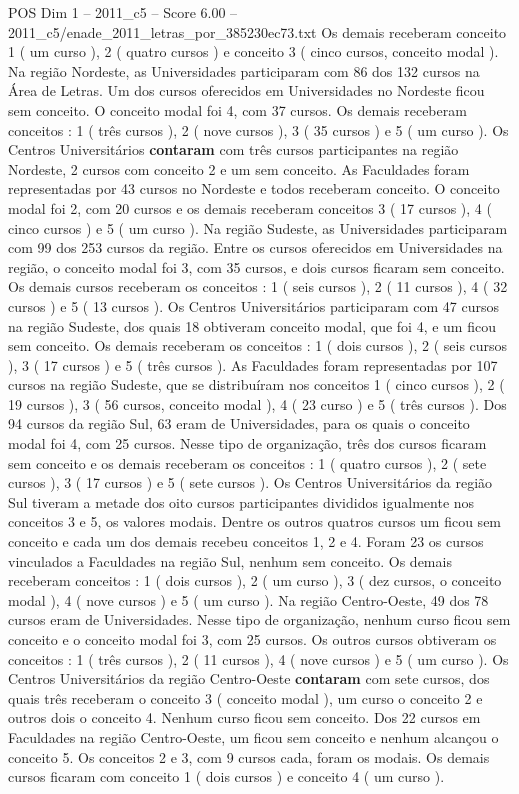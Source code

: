 \begin{textsample}{POS Dim 1 – 2011\_c5 – Score 6.00 – 2011\_c5/enade\_2011\_letras\_por\_385230ec73.txt}
Os demais receberam conceito 1 ( um curso ), 2 ( quatro cursos ) e conceito 3 ( cinco cursos, conceito modal ).
Na região Nordeste, as Universidades participaram com 86 dos 132 cursos na Área de Letras.
Um dos cursos oferecidos em Universidades no Nordeste ficou sem conceito.
O conceito modal foi 4, com 37 cursos.
Os demais receberam conceitos : 1 ( três cursos ), 2 ( nove cursos ), 3 ( 35 cursos ) e 5 ( um curso ).
Os Centros Universitários \textbf{contaram} com três cursos participantes na região Nordeste, 2 cursos com conceito 2 e um sem conceito.
As Faculdades foram representadas por 43 cursos no Nordeste e todos receberam conceito.
O conceito modal foi 2, com 20 cursos e os demais receberam conceitos 3 ( 17 cursos ), 4 ( cinco cursos ) e 5 ( um curso ).
Na região Sudeste, as Universidades participaram com 99 dos 253 cursos da região.
Entre os cursos oferecidos em Universidades na região, o conceito modal foi 3, com 35 cursos, e dois cursos ficaram sem conceito.
Os demais cursos receberam os conceitos : 1 ( seis cursos ), 2 ( 11 cursos ), 4 ( 32 cursos ) e 5 ( 13 cursos ).
Os Centros Universitários participaram com 47 cursos na região Sudeste, dos quais 18 obtiveram conceito modal, que foi 4, e um ficou sem conceito.
Os demais receberam os conceitos : 1 ( dois cursos ), 2 ( seis cursos ), 3 ( 17 cursos ) e 5 ( três cursos ).
As Faculdades foram representadas por 107 cursos na região Sudeste, que se distribuíram nos conceitos 1 ( cinco cursos ), 2 ( 19 cursos ), 3 ( 56 cursos, conceito modal ), 4 ( 23 curso ) e 5 ( três cursos ).
Dos 94 cursos da região Sul, 63 eram de Universidades, para os quais o conceito modal foi 4, com 25 cursos.
Nesse tipo de organização, três dos cursos ficaram sem conceito e os demais receberam os conceitos : 1 ( quatro cursos ), 2 ( sete cursos ), 3 ( 17 cursos ) e 5 ( sete cursos ).
Os Centros Universitários da região Sul tiveram a metade dos oito cursos participantes divididos igualmente nos conceitos 3 e 5, os valores modais.
Dentre os outros quatros cursos um ficou sem conceito e cada um dos demais recebeu conceitos 1, 2 e 4.
Foram 23 os cursos vinculados a Faculdades na região Sul, nenhum sem conceito.
Os demais receberam conceitos : 1 ( dois cursos ), 2 ( um curso ), 3 ( dez cursos, o conceito modal ), 4 ( nove cursos ) e 5 ( um curso ).
Na região Centro-Oeste, 49 dos 78 cursos eram de Universidades.
Nesse tipo de organização, nenhum curso ficou sem conceito e o conceito modal foi 3, com 25 cursos.
Os outros cursos obtiveram os conceitos : 1 ( três cursos ), 2 ( 11 cursos ), 4 ( nove cursos ) e 5 ( um curso ).
Os Centros Universitários da região Centro-Oeste \textbf{contaram} com sete cursos, dos quais três receberam o conceito 3 ( conceito modal ), um curso o conceito 2 e outros dois o conceito 4.
Nenhum curso ficou sem conceito.
Dos 22 cursos em Faculdades na região Centro-Oeste, um ficou sem conceito e nenhum alcançou o conceito 5.
Os conceitos 2 e 3, com 9 cursos cada, foram os modais.
Os demais cursos ficaram com conceito 1 ( dois cursos ) e conceito 4 ( um curso ).

\end{textsample}
